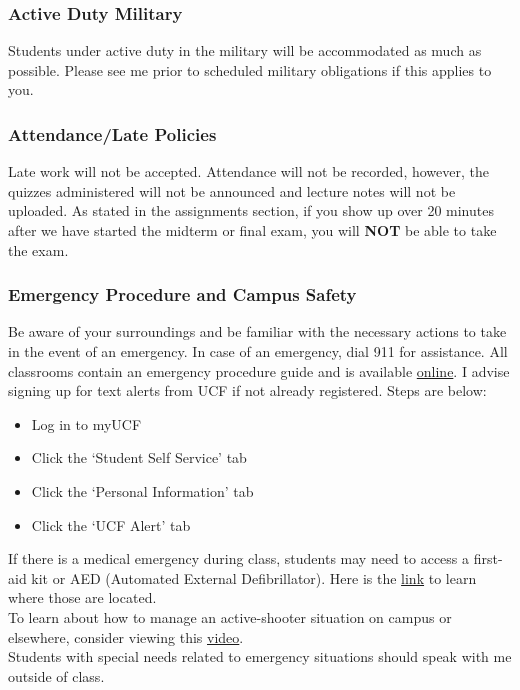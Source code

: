 \documentclass[11pt]{paper}
\begin{document}
\subsubsection*{Active Duty Military}
Students under active duty in the military will be accommodated as much as possible. Please see me  prior to scheduled military obligations if this applies to you.
\subsubsection*{Attendance/Late Policies}
Late work will not be accepted. Attendance will not be recorded, however, the quizzes administered will not be announced and lecture notes will not be uploaded. As stated in the assignments section, if you show up over 20 minutes after we have started the midterm or final exam, you will \textbf{NOT} be able to take the exam.
\subsubsection*{Emergency Procedure and Campus Safety}
Be aware of your surroundings and be familiar with the necessary actions to take in the event of an emergency. In case of an emergency, dial 911 for assistance. All classrooms contain an emergency procedure guide and is available \href{http://emergency.ucf.edu/emergency_guide.html}{online}. I advise signing up for text alerts from UCF if not already registered. Steps are below:
\begin{itemize}
	\item Log in to myUCF
	\item Click the `Student Self Service' tab
	\item Click the `Personal Information' tab
	\item Click the `UCF Alert' tab
\end{itemize} 

If there is a medical emergency during class, students may need to access a
first-aid kit or AED (Automated External Defibrillator). Here is the \href{http://www.ehs.ucf.edu/AEDlocations-UCF}{link} to learn where those are located.\\

To learn about how to manage an active-shooter situation on campus or elsewhere, consider viewing this \href{https://www.youtube.com/watch?v=NIKYajEx4pk&feature=youtu.be}{video}.\\

Students with special needs related to emergency situations should speak with me outside of class.
\end{document}
